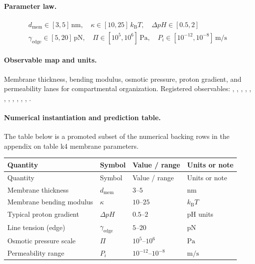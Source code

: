 \paragraph{Parameter law.}
\[
\begin{gathered} d_{\mathrm{mem}} \in [3, 5]\,\mathrm{nm},\quad \kappa \in [10, 25]\,k_{\mathrm{B}}T,\quad \Delta pH \in [0.5, 2] \\ \gamma_{\mathrm{edge}} \in [5,20]\,\mathrm{pN},\quad \Pi \in [10^5,10^6]\,\mathrm{Pa},\quad P_i \in [10^{-12},10^{-8}]\,\mathrm{m/s} \end{gathered}
\]

\paragraph{Observable map and units.}
Membrane thickness, bending modulus, osmotic pressure, proton gradient, and permeability lanes for compartmental organization.
Registered observables: , \allowbreak {}, \allowbreak {}, \allowbreak {}, \allowbreak {}, \allowbreak {}, \allowbreak {}, \allowbreak {}, \allowbreak {}, \allowbreak {}, \allowbreak {}, \allowbreak {}.

\paragraph{Numerical instantiation and prediction table.}
The table below is a promoted subset of the numerical backing rows in the appendix on table k4 membrane parameters.
\begin{longtable}{@{}L{0.27\textwidth}L{0.15\textwidth}L{0.24\textwidth}L{0.16\textwidth}@{}}
\toprule
Quantity & Symbol & Value / range & Units or note \\
\midrule
\endfirsthead
\toprule
Quantity & Symbol & Value / range & Units or note \\
\midrule
\endhead
Membrane thickness & $\scriptstyle d_{\mathrm{mem}}$ & $3\text{--}5$ & $\mathrm{nm}$ \\
Membrane bending modulus & $\scriptstyle \kappa$ & $10\text{--}25$ & $k_{\mathrm{B}}T$ \\
Typical proton gradient & $\scriptstyle \Delta pH$ & $0.5\text{--}2$ & pH units \\
Line tension (edge) & $\scriptstyle \gamma_{\mathrm{edge}}$ & $5\text{--}20$ & $\mathrm{pN}$ \\
Osmotic pressure scale & $\scriptstyle \Pi$ & $10^5\text{--}10^6$ & $\mathrm{Pa}$ \\
Permeability range & $\scriptstyle P_i$ & $10^{-12}\text{--}10^{-8}$ & $\mathrm{m/s}$ \\
\bottomrule
\end{longtable}

